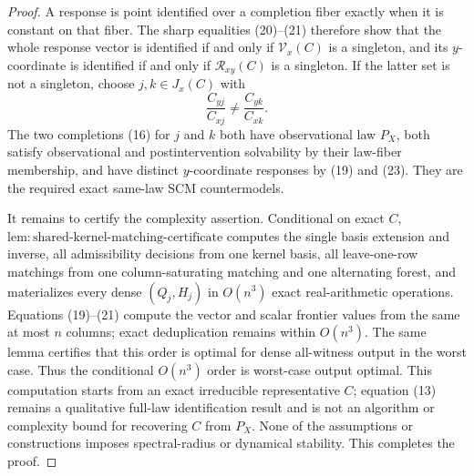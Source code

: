 \documentclass{article}
\begin{document}
\begin{proof}
A response is point identified over a completion fiber exactly when it is constant on that fiber. The sharp equalities (20)--(21) therefore show that the whole response vector is identified if and only if \(\mathcal V_x(C)\) is a singleton, and its \(y\)-coordinate is identified if and only if \(\mathcal R_{xy}(C)\) is a singleton. If the latter set is not a singleton, choose \(j,k\in J_x(C)\) with
\[
 \frac{C_{yj}}{C_{xj}}\ne\frac{C_{yk}}{C_{xk}}. \tag{23}
\]
The two completions (16) for \(j\) and \(k\) both have observational law \(P_X\), both satisfy observational and postintervention solvability by their law-fiber membership, and have distinct \(y\)-coordinate responses by (19) and (23). They are the required exact same-law SCM countermodels.

It remains to certify the complexity assertion. Conditional on exact \(C\), \(\mathrm{lem{:}shared\text{-}kernel\text{-}matching\text{-}certificate}\) computes the single basis extension and inverse, all admissibility decisions from one kernel basis, all leave-one-row matchings from one column-saturating matching and one alternating forest, and materializes every dense \((Q_j,H_j)\) in \(O(n^3)\) exact real-arithmetic operations. Equations (19)--(21) compute the vector and scalar frontier values from the same at most \(n\) columns; exact deduplication remains within \(O(n^3)\). The same lemma certifies that this order is optimal for dense all-witness output in the worst case. Thus the conditional \(O(n^3)\) order is worst-case output optimal. This computation starts from an exact irreducible representative \(C\); equation (13) remains a qualitative full-law identification result and is not an algorithm or complexity bound for recovering \(C\) from \(P_X\). None of the assumptions or constructions imposes spectral-radius or dynamical stability. This completes the proof.
\end{proof}
\end{document}

